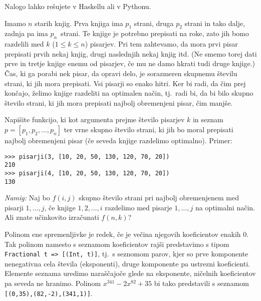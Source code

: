 \documentclass[arhiv]{../izpit}
\begin{document}

Nalogo lahko rešujete v Haskellu ali v Pythonu.

\vspace{0.5\baselineskip}\noindent
Imamo $n$ starih knjig. Prva knjiga ima $p_1$ strani, druga $p_2$ strani in tako dalje, zadnja pa ima $p_n$~strani.
Te knjige je potrebno prepisati na roke, zato jih bomo razdelili med $k$ ($1 \leq k \leq n$) pisarjev. Pri tem zahtevamo, da mora prvi
pisar prepisati prvih nekaj knjig, drugi naslednjih nekaj knjig itd.  (Ne smemo torej dati prve in tretje knjige enemu od pisarjev, če mu ne damo
hkrati tudi druge knjige.) Čas, ki ga porabi nek pisar, da opravi delo, je sorazmeren skupnemu številu strani, ki jih mora prepisati.
Vsi pisarji so enako hitri. Ker bi radi, da čim prej končajo, želimo knjige razdeliti na optimalen način, tj.\ radi bi, da bi bilo skupno
število strani, ki jih mora prepisati najbolj obremenjeni pisar, čim manjše.

\vspace{0.5\baselineskip}\noindent
Napišite funkcijo, ki kot argumenta prejme število pisarjev $k$ in seznam $p = [p_1, p_2, \ldots, p_n]$ ter vrne skupno število
strani, ki jih bo moral prepisati najbolj obremenjeni pisar (če seveda knjige razdelimo optimalno). Primer:

\begin{verbatim}>>> pisarji(3, [10, 20, 50, 130, 120, 70, 20])
210
>>> pisarji(4, [10, 20, 50, 130, 120, 70, 20])
130
\end{verbatim}
%

\vspace{0.5\baselineskip}\noindent
\textit{Namig:} Naj bo $f(i, j)$ skupno število strani pri najbolj obremenjenem med pisarji $1, \ldots, j$, če knjige $1, 2, \ldots, i$ razdelimo med
pisarje $1, \ldots, j$ na optimalni način. Ali znate učinkovito izračunati $f(n, k)$? 



Polinom ene spremenljivke je redek, če je večina njegovih koeficientov enakih 0. Tak polinom namesto s seznamom koeficientov rajši predstavimo s tipom \verb+Fractional t => [(Int, t)]+, tj.\ s seznomom parov, kjer so prve komponente nenegativna cela števila (eksponenti), druge komponente pa ustrezni koeficienti. Elemente seznama uredimo naraščajoče glede na eksponente, ničelnih koeficientov pa seveda ne hranimo. Polinom $x^{341} - 2 x^{82} + 35$ bi tako predstavili s seznamom \verb+[(0,35),(82,-2),(341,1)]+.
\end{document}
